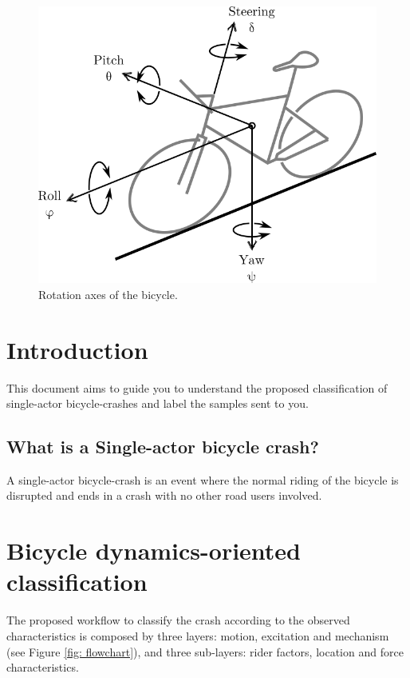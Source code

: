 \documentclass{article}
\begin{document}
\begin{figure}[h]
    \centering
    \includegraphics[scale=1.0]{bike-dof.png}
    \caption{Rotation axes of the bicycle.}
    \label{fig: bike-dof}
\end{figure}


\section{Introduction}

This document aims to guide you to understand the proposed classification \cite{Jac04} of single-actor bicycle-crashes and label the samples sent to you.

\subsection{What is a Single-actor bicycle crash?}

A single-actor bicycle-crash is an event where the normal riding of the bicycle is disrupted and ends in a crash with no other road users involved.

\section{Bicycle dynamics-oriented classification}

The proposed workflow to classify the crash according to the observed characteristics is composed by three layers: motion, excitation and mechanism (see Figure \ref{fig: flowchart}), and three sub-layers: rider factors, location and force characteristics.
\end{document}

